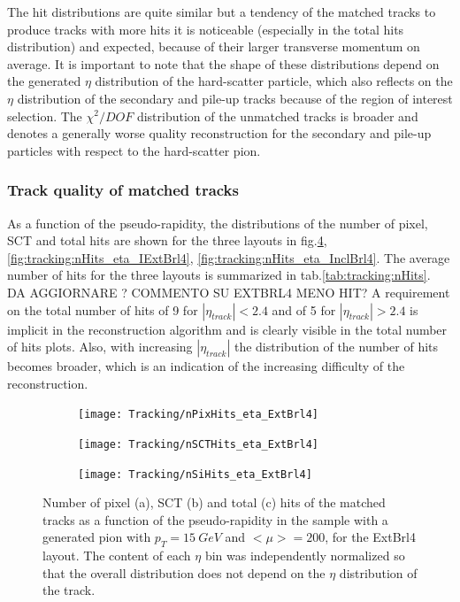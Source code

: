 \documentclass[a4paper,twoside,12pt]{article}
\begin{document}
The hit distributions are quite similar but a tendency of the matched tracks to produce tracks with more hits it is noticeable (especially in the total hits distribution) and expected, because of their larger transverse momentum on average. It is important to note that the shape of these distributions depend on the generated $\eta$ distribution of the hard-scatter particle, which
also reflects on the $\eta$ distribution of the secondary and pile-up tracks because of the region of interest selection. The $\chi^2/DOF$ distribution of the unmatched tracks is broader and denotes a generally worse quality reconstruction for the secondary 
and pile-up particles with respect to the hard-scatter pion. \\

\subsubsection{Track quality of matched tracks}
As a function of the pseudo-rapidity, the distributions of the number of pixel, SCT and total hits are shown for the three layouts in fig.\ref{fig:tracking:nHits_eta_ExtBrl4},
 \ref{fig:tracking:nHits_eta_IExtBrl4}, \ref{fig:tracking:nHits_eta_InclBrl4}. The average number of hits for the three layouts is summarized in tab.\ref{tab:tracking:nHits}. DA AGGIORNARE ? COMMENTO SU EXTBRL4 MENO HIT? A requirement on the total number of hits of 9 for $|\eta_{track}| < 2.4$ and of 5 for $|\eta_{track}| > 2.4$ is implicit in the reconstruction algorithm
 and is clearly visible in the total number of hits plots. Also, with increasing $|\eta_{track}|$ the distribution of the number of hits becomes broader, which is an indication of the increasing
 difficulty of the reconstruction.  \\

\begin{figure}
\begin{subfigure}{\linewidth}
\centering
\texttt{[image: Tracking/nPixHits\_eta\_ExtBrl4]}
\caption{}
\label{fig:tracking:nPixHits_eta_ExtBrl4}
\end{subfigure}

\begin{subfigure}{\linewidth}
\centering
\texttt{[image: Tracking/nSCTHits\_eta\_ExtBrl4]}
\caption{}
\label{fig:tracking:nSCTHits_eta_ExtBrl4}
\end{subfigure}

\begin{subfigure}{\linewidth}
\centering
\texttt{[image: Tracking/nSiHits\_eta\_ExtBrl4]}
\caption{}
\label{fig:tracking:nSiHits_eta_ExtBrl4}
\end{subfigure}

\label{fig:tracking:nHits_eta_ExtBrl4}
\caption{Number of pixel (a), SCT (b) and total (c) hits of the matched tracks as a function of the pseudo-rapidity in the sample with a generated pion with $p_{T} = 15\ GeV$ and $<\mu> = 200$, for the ExtBrl4 layout. The content of each $\eta$ bin was independently normalized so that the overall distribution does not depend on the $\eta$ distribution of the track.}
\end{figure}
\end{document}
